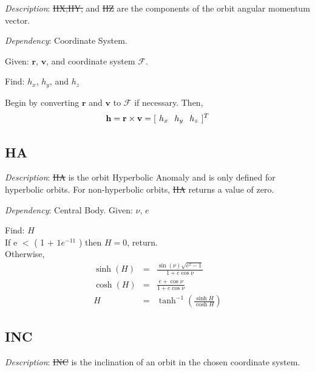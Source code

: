 \noindent \textit{Description}: \st{HX,HY,} and \st{HZ} are the
components of the orbit angular momentum vector.

\noindent \textit{Dependency}:  Coordinate System.

\noindent Given:  $\mathbf{r}$, $\mathbf{v}$, and coordinate system
$\mathcal{F}$.

\noindent Find:  $h_x$, $h_y$, and $h_z$

Begin by converting $\mathbf{r}$ and $\mathbf{v}$ to $\mathcal{F}$
if necessary. Then,
%
\begin{equation}
    \mathbf{h} = \mathbf{r} \times \mathbf{v} = [\hspace{.05 in} h_x
    \hspace{.1 in} h_y \hspace{.1 in} h_z \hspace{.05 in} ]^T
\end{equation}


\subsection{HA}  \label{sec:HyperbolicAnomaly}

\noindent \textit{Description}: \st{HA} is the orbit Hyperbolic
Anomaly and is only defined for hyperbolic orbits.  For
non-hyperbolic orbits, \st{HA} returns a value of zero.

\noindent \textit{Dependency}:  Central Body.
 Given: $\nu$, $e$

\noindent Find:  $H$\\
%

\noindent If e $<$ ( 1 + $1e^{-11}$ ) then $H = 0$, return.\\
%


\noindent Otherwise,
%
\begin{eqnarray}
    \sinh(H) & = & \frac{ \sin(\nu) \sqrt{e^2 - 1}}{1+e \cos{\nu}}    \\    %
    \cosh(H) & = & \frac{ e + \cos{\nu} }{1+e \cos{\nu}}   \\     %
    H & = & \tanh^{-1}(\frac{\sinh{H}}{\cosh{H}})
\end{eqnarray}
%

\subsection{INC} 

\noindent \textit{Description}: \st{INC} is the inclination of an
orbit in the chosen coordinate system.

